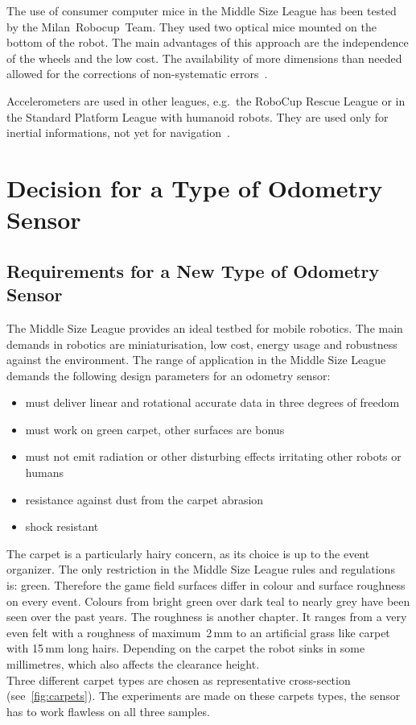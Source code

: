 \documentclass[12pt,a4paper]{article}
\newcommand{\MSL}{Middle Size League\xspace}
\begin{document}
The use of consumer computer mice in the \MSL has been tested by the Milan~Robocup~Team.
They used two optical mice mounted on the bottom of the robot.
The main advantages of this approach are the independence of the wheels and the low cost.
The availability of more dimensions than needed allowed for the corrections of non-systematic errors~\cite{two_mice}.

Accelerometers are used in other leagues, e.g.\ the RoboCup Rescue League or in the Standard Platform League with humanoid robots.
They are used only for inertial informations, not yet for navigation~\cite{zadeat}.

\clearpage
\section{Decision for a Type of Odometry Sensor}
\label{decision}


\subsection{Requirements for a New Type of Odometry Sensor}
\label{requirements}

The \MSL provides an ideal testbed for mobile robotics.
The main demands in robotics are miniaturisation, low cost, energy usage and robustness against the environment.
The range of application in the \MSL demands the following design parameters for an odometry sensor: %
\begin{itemize}
  \item must deliver linear and rotational accurate data in three degrees of freedom
  \item must work on green carpet, other surfaces are bonus
  \item must not emit radiation or other disturbing effects irritating other robots or humans
  \item resistance against dust from the carpet abrasion
  \item shock resistant
\end{itemize}

The carpet is a particularly hairy concern, as its choice is up to the event organizer.
The only restriction in the \MSL rules and regulations~\cite{msl-rules} is: green.
Therefore the game field surfaces differ in colour and surface roughness on every event.
Colours from bright green over dark teal to nearly grey have been seen over the past years.
The roughness is another chapter.
It ranges from a very even felt with a roughness of maximum~2\,mm to an artificial grass like carpet with 15\,mm long hairs. 
Depending on the carpet the robot sinks in some millimetres, which also affects the clearance height.\\
Three different carpet types are chosen as representative cross-section (see~\autoref{fig:carpets}).
The experiments are made on these carpets types, the sensor has to work flawless on all three samples.
\end{document}

